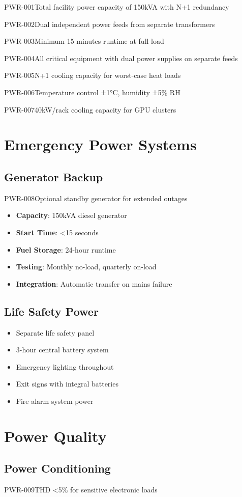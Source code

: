 \begin{requirement}{PWR-001}{Total facility power capacity of 150kVA with N+1 redundancy}
\begin{requirement}{PWR-002}{Dual independent power feeds from separate transformers}
\begin{requirement}{PWR-003}{Minimum 15 minutes runtime at full load}
\begin{requirement}{PWR-004}{All critical equipment with dual power supplies on separate feeds}
\begin{requirement}{PWR-005}{N+1 cooling capacity for worst-case heat loads}
\begin{requirement}{PWR-006}{Temperature control ±1°C, humidity ±5\% RH}
\begin{requirement}{PWR-007}{40kW/rack cooling capacity for GPU clusters}
\section{Emergency Power Systems}

\subsection{Generator Backup}

\begin{requirement}{PWR-008}{Optional standby generator for extended outages}

\begin{itemize}
    \item \textbf{Capacity}: 150kVA diesel generator
    \item \textbf{Start Time}: <15 seconds
    \item \textbf{Fuel Storage}: 24-hour runtime
    \item \textbf{Testing}: Monthly no-load, quarterly on-load
    \item \textbf{Integration}: Automatic transfer on mains failure
\end{itemize}

\subsection{Life Safety Power}

\begin{itemize}
    \item Separate life safety panel
    \item 3-hour central battery system
    \item Emergency lighting throughout
    \item Exit signs with integral batteries
    \item Fire alarm system power
\end{itemize}

\section{Power Quality}

\subsection{Power Conditioning}

\begin{requirement}{PWR-009}{THD <5\% for sensitive electronic loads}


\end{requirement}
\end{requirement}
\end{requirement}
\end{requirement}
\end{requirement}
\end{requirement}
\end{requirement}
\end{requirement}
\end{requirement}
